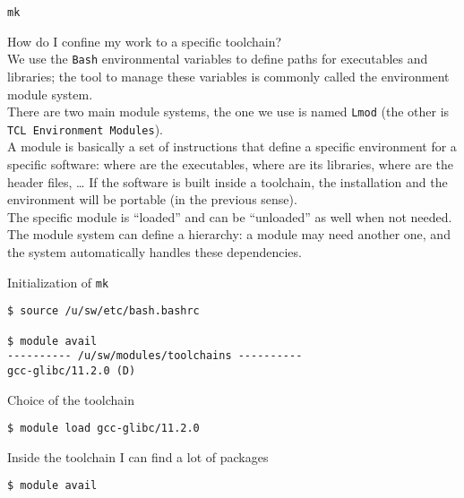\documentclass[10pt,aspectratio=169]{beamer}
\begin{document}
\begin{frame}{\texttt{mk}}

  How do I confine my work to a specific toolchain?\\[3mm]

  We use the \texttt{Bash} environmental variables to define paths for executables and libraries; the tool to manage these variables is commonly called 
  the environment module system.\\[3mm]

  There are two main module systems, the one we use is named \texttt{Lmod} (the other is \texttt{TCL Environment Modules}).\\[3mm]

  A module is basically a set of instructions that define a specific environment for a specific software: where are the executables, where are its libraries, where are the header files, … 
  If the software is built inside a toolchain, the installation and the environment  will be portable (in the previous sense).\\[3mm]

  The specific module is “loaded” and can be “unloaded” as well when not needed.\\[3mm]

  The module system can define a hierarchy: a module may need another one, and the system automatically handles these dependencies.

\end{frame}

\begin{frame}[fragile]

  Initialization of \texttt{mk}

\begin{verbatim}
$ source /u/sw/etc/bash.bashrc

$ module avail
---------- /u/sw/modules/toolchains ----------
gcc-glibc/11.2.0 (D)
\end{verbatim}

Choice of the toolchain
\begin{verbatim}
$ module load gcc-glibc/11.2.0
\end{verbatim}

Inside the toolchain I can find a lot of packages
\begin{verbatim}
$ module avail
\end{verbatim}
\end{frame}
\end{document}
